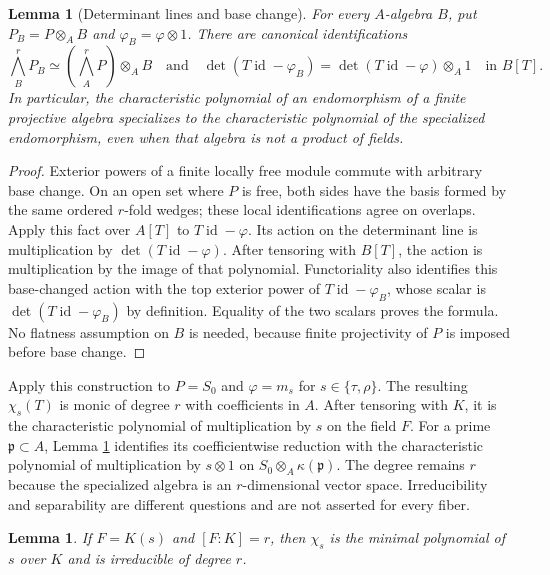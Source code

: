 \documentclass[11pt]{article}
\newtheorem{lemma}[theorem]{Lemma}
\theoremstyle{definition}
\theoremstyle{remark}
\newcommand{\id}{\operatorname{id}}
\begin{document}
\begin{lemma}[Determinant lines and base change]
\label{lem:determinant-base-change}
For every $A$-algebra $B$, put $P_B=P\otimes_AB$ and
$\varphi_B=\varphi\otimes1$.  There are canonical identifications
\[
 \bigwedge_B^rP_B\simeq
 \left(\bigwedge_A^rP\right)\otimes_AB
 \quad\text{and}\quad
 \det(T\id-\varphi_B)
 =\det(T\id-\varphi)\otimes_A1
 \quad\text{in }B[T].
\]
In particular, the characteristic polynomial of an endomorphism of a
finite projective algebra specializes to the characteristic polynomial of
the specialized endomorphism, even when that algebra is not a product of
fields.
\end{lemma}

\begin{proof}
Exterior powers of a finite locally free module commute with arbitrary base
change.  On an open set where $P$ is free, both sides have the basis formed
by the same ordered $r$-fold wedges; these local identifications agree on
overlaps.  Apply this fact over $A[T]$ to $T\id-\varphi$.  Its action on the
determinant line is multiplication by $\det(T\id-\varphi)$.  After tensoring
with $B[T]$, the action is multiplication by the image of that polynomial.
Functoriality also identifies this base-changed action with the top exterior
power of $T\id-\varphi_B$, whose scalar is
$\det(T\id-\varphi_B)$ by definition.  Equality of the two scalars proves
the formula.  No flatness assumption on $B$ is needed, because finite
projectivity of $P$ is imposed before base change.
\end{proof}

Apply this construction to $P=S_0$ and $\varphi=m_s$ for
$s\in\{\tau,\rho\}$.  The resulting $\chi_s(T)$ is monic of degree $r$ with
coefficients in $A$.  After tensoring with $K$, it is the characteristic
polynomial of multiplication by $s$ on the field $F$.
For a prime $\mathfrak p\subset A$, Lemma
\ref{lem:determinant-base-change} identifies its coefficientwise reduction
with the characteristic polynomial of multiplication by $s\otimes1$ on
$S_0\otimes_A\kappa(\mathfrak p)$.  The degree remains $r$ because the
specialized algebra is an $r$-dimensional vector space.  Irreducibility and
separability are different questions and are not asserted for every fiber.

\begin{lemma}\label{lem:minimal-characteristic}
If $F=K(s)$ and $[F:K]=r$, then $\chi_s$ is the minimal polynomial of $s$
over $K$ and is irreducible of degree $r$.
\end{lemma}
\end{document}
